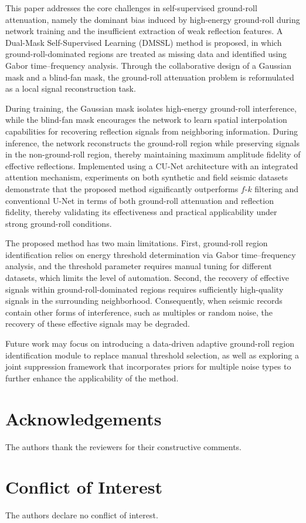 \documentclass[alpha-refs]{wiley-article}
\begin{document}
This paper addresses the core challenges in self-supervised ground-roll attenuation, namely the 
dominant bias induced by high-energy ground-roll during network training and the insufficient 
extraction of weak reflection features. A Dual-Mask Self-Supervised Learning (DMSSL) method is 
proposed, in which ground-roll-dominated regions are treated as missing data and identified using 
Gabor time--frequency analysis. Through the collaborative design of a Gaussian mask and a 
blind-fan mask, the ground-roll attenuation problem is reformulated as a local signal 
reconstruction task. 

During training, the Gaussian mask isolates high-energy ground-roll interference, while the 
blind-fan mask encourages the network to learn spatial interpolation capabilities for recovering 
reflection signals from neighboring information. During inference, the network reconstructs the 
ground-roll region while preserving signals in the non-ground-roll region, thereby maintaining 
maximum amplitude fidelity of effective reflections. Implemented using a CU-Net architecture 
with an integrated attention mechanism, experiments on both synthetic and field seismic datasets 
demonstrate that the proposed method significantly outperforms $f$-$k$ filtering and conventional 
U-Net in terms of both ground-roll attenuation and reflection fidelity, thereby validating its 
effectiveness and practical applicability under strong ground-roll conditions.

The proposed method has two main limitations. First, ground-roll region identification relies 
on energy threshold determination via Gabor time--frequency analysis, and the threshold 
parameter requires manual tuning for different datasets, which limits the level of automation. 
Second, the recovery of effective signals within ground-roll-dominated regions requires 
sufficiently high-quality signals in the surrounding neighborhood. Consequently, when seismic 
records contain other forms of interference, such as multiples or random noise, the recovery 
of these effective signals may be degraded. 

Future work may focus on introducing a data-driven adaptive ground-roll region 
identification module to replace manual threshold selection, as well as exploring a joint 
suppression framework that incorporates priors for multiple noise types to further enhance 
the applicability of the method.

\section*{Acknowledgements}
The authors thank the reviewers for their constructive comments.

\section*{Conflict of Interest}
The authors declare no conflict of interest.


\end{document}
